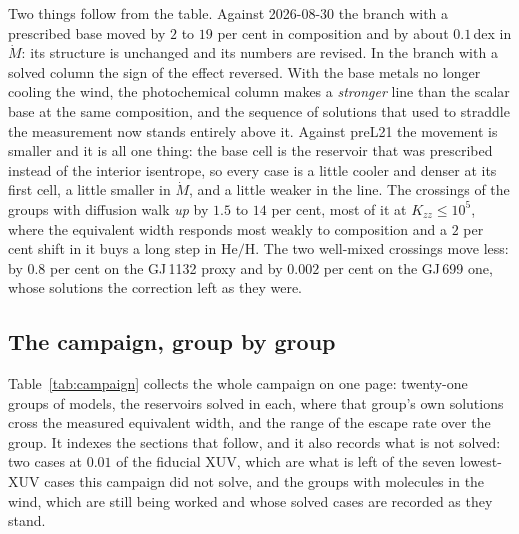 \documentclass[english,a4paper]{my_memo}
\begin{document}
\noindent Two things follow from the table. Against 2026-08-30 the branch
with a prescribed base moved by $2$ to $19$ per cent in composition and by
about $0.1$\,dex in $\dot M$: its structure is unchanged and its numbers are
revised. In the branch with a solved column the sign of the effect reversed.
With the base metals no longer cooling the wind, the photochemical column
makes a \emph{stronger} line than the scalar base at the same composition,
and the sequence of solutions that used to straddle the measurement now
stands entirely above it. Against preL21 the movement is smaller and it is
all one thing: the base cell is the reservoir that was prescribed instead of
the interior isentrope, so every case is a little cooler and denser at its
first cell, a little smaller in $\dot M$, and a little weaker in the line.
The crossings of the groups with diffusion walk \emph{up} by $1.5$ to $14$
per cent, most of it at $K_{zz} \le 10^{5}$, where the equivalent width
responds most weakly to composition and a $2$ per cent shift in it buys a
long step in $\mathrm{He/H}$. The two well-mixed crossings move less: by
$0.8$ per cent on the GJ\,1132 proxy and by $0.002$ per cent on the GJ\,699
one, whose solutions the correction left as they were.

\subsection{The campaign, group by group}
\label{sec:campaign}

Table~\ref{tab:campaign} collects the whole campaign on one page: twenty-one
groups of models, the reservoirs solved in each, where that group's own
solutions cross the measured equivalent width, and the range of the escape
rate over the group. It indexes the sections that follow, and it also records
what is not solved: two cases at $0.01$ of the fiducial XUV, which are what
is left of the seven lowest-XUV cases this campaign did not solve, and the
groups with molecules in the wind, which are still being worked and whose
solved cases are recorded as they stand.
\end{document}

